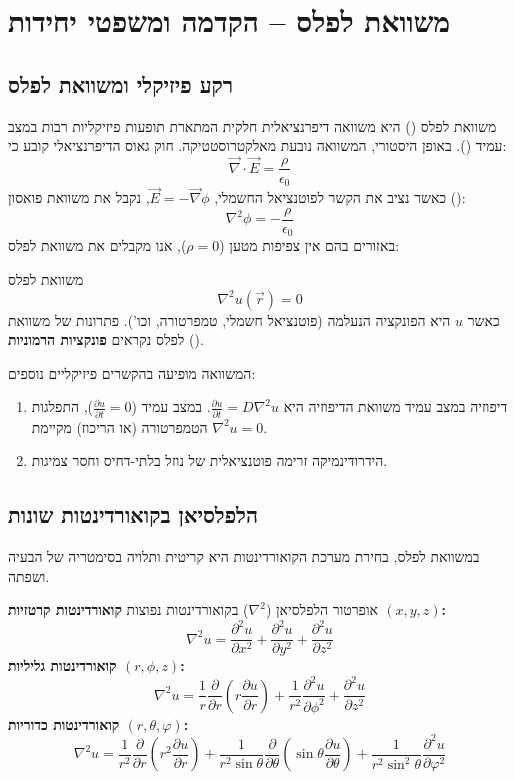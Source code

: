 \section{משוואת לפלס – הקדמה ומשפטי יחידות}

\subsection{רקע פיזיקלי ומשוואת לפלס}
משוואת לפלס () היא משוואה דיפרנציאלית חלקית המתארת תופעות פיזיקליות רבות במצב עמיד (). באופן היסטורי, המשוואה נובעת מאלקטרוסטטיקה. חוק גאוס הדיפרנציאלי קובע כי:
\[
\vec{\nabla} \cdot \vec{E} = \frac{\rho}{\epsilon_0}
\]
כאשר נציב את הקשר לפוטנציאל החשמלי, $\vec{E} = -\vec{\nabla} \phi$, נקבל את משוואת פואסון ():
\[
\nabla^2 \phi = -\frac{\rho}{\epsilon_0}
\]
באזורים בהם אין צפיפות מטען ($\rho=0$), אנו מקבלים את משוואת לפלס:
\begin{definitionbox}{משוואת לפלס}
\[
\nabla^2 u(\vec{r}) = 0
\]
כאשר $u$ היא הפונקציה הנעלמה (פוטנציאל חשמלי, טמפרטורה, וכו'). פתרונות של משוואת לפלס נקראים \textbf{פונקציות הרמוניות} ().
\end{definitionbox}

המשוואה מופיעה בהקשרים פיזיקליים נוספים:
\begin{enumerate}
    \item דיפוזיה במצב עמיד משוואת הדיפוזיה היא $\frac{\partial u}{\partial t} = D \nabla^2 u$. במצב עמיד ($\frac{\partial u}{\partial t} = 0$), התפלגות הטמפרטורה (או הריכוז) מקיימת $\nabla^2 u = 0$.
    \item הידרודינמיקה זרימה פוטנציאלית של נוזל בלתי-דחיס וחסר צמיגות.
\end{enumerate}

\subsection{הלפלסיאן בקואורדינטות שונות}
במשוואת לפלס, בחירת מערכת הקואורדינטות היא קריטית ותלויה בסימטריה של הבעיה ושפתה.

\begin{resultbox}{אופרטור הלפלסיאן ($\nabla^2$) בקואורדינטות נפוצות}
\textbf{קואורדינטות קרטזיות $(x,y,z)$:}
\[
\nabla^2 u = \frac{\partial^2 u}{\partial x^2} + \frac{\partial^2 u}{\partial y^2} + \frac{\partial^2 u}{\partial z^2}
\]
\textbf{קואורדינטות גליליות $(r,\phi,z)$:}
\[
\nabla^2 u = \frac{1}{r} \frac{\partial}{\partial r} \left( r \frac{\partial u}{\partial r} \right) + \frac{1}{r^2} \frac{\partial^2 u}{\partial \phi^2} + \frac{\partial^2 u}{\partial z^2}
\]
\textbf{קואורדינטות כדוריות $(r,\theta,\varphi)$:}
\[
\nabla^2 u = \frac{1}{r^2} \frac{\partial}{\partial r} \left( r^2 \frac{\partial u}{\partial r} \right) + \frac{1}{r^2 \sin \theta} \frac{\partial}{\partial \theta} \left( \sin \theta \frac{\partial u}{\partial \theta} \right) + \frac{1}{r^2 \sin^2 \theta} \frac{\partial^2 u}{\partial \varphi^2}
\]
\end{resultbox}

